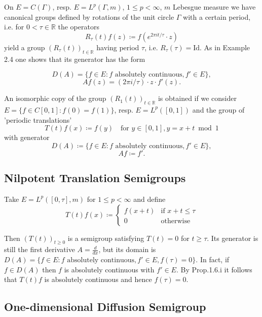 On $E = C(\Gamma)$, resp. $E = L^{p}(\Gamma,m)$, $1 \leq p < \infty$, $m$ Lebesgue measure we have canonical groups defined by rotations of the unit circle $\Gamma$ with a certain period, i.e. for $0 < \tau \in \mathbb{R}$ the operators
\[
    R_{\tau}(t)f(z) \coloneqq f(e^{2\pi it/\tau}\cdot z)
\]
yield a group $(R_{\tau}(t))_{t \in \mathbb{R}}$ having period $\tau$, i.e. $R_{\tau}(\tau) = \text{Id}$.
As in Example 2.4 one shows that its generator has the form

\newpage

\[
    D(A) = \{f \in E : f \text{ absolutely continuous}, f' \in E\},
\]
\[
    Af(z) = (2\pi i/\tau) \cdot z \cdot f'(z).
\]

An isomorphic copy of the group $(R_{1}(t))_{t \in \mathbb{R}}$ is obtained if we consider $E = \{f \in C[0,1] : f(0) = f(1)\}$, resp. $E = L^{p}([0,1])$ and the group of 'periodic translations'
\[
    T(t)f(x) \coloneqq f(y) \quad \text{for } y \in [0,1], y = x+t \bmod 1
\]
with generator
\[
    D(A) \coloneqq \{f \in E : f \text{ absolutely continuous}, f' \in E\},
\]
\[
    Af \coloneqq f'.
\]

\subsection{Nilpotent Translation Semigroups}\label{subsec:a1-2.6}

Take $E = L^{p}([0,\tau],m)$ for $1 \leq p < \infty$ and define
\[
    T(t)f(x) \coloneqq \begin{cases}
        f(x+t) & \text{if } x+t \leq \tau \\
        0 & \text{otherwise}
    \end{cases}
\]

Then $(T(t))_{t\geq 0}$ is a semigroup satisfying $T(t) = 0$ for $t \geq \tau$.
Its generator is still the first derivative $A = \frac{d}{dx}$, but its domain is $D(A) = \{f \in E : f \text{ absolutely continuous}, f' \in E, f(\tau) = 0\}$.
In fact, if $f \in D(A)$ then $f$ is absolutely continuous with $f' \in E$.
By Prop.1.6.i it follows that $T(t)f$ is absolutely continuous and hence $f(\tau) = 0$.

\subsection{One-dimensional Diffusion Semigroup}\label{subsec:a1-2.7}

